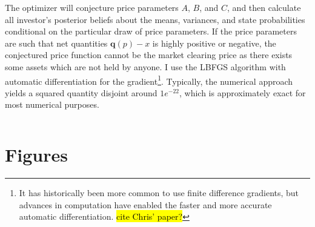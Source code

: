 \documentclass{article}
\begin{document}
The optimizer will conjecture price parameters $A$, $B$, and $C$, and then calculate all investor's posterior beliefs about the means, variances, and state probabilities conditional on the particular draw of price parameters. If the price parameters are such that net quantities $\mathbf{q}(p) - x$ is highly positive or negative, the conjectured price function cannot be the market clearing price as there exists some assets which are not held by anyone. I use the LBFGS algorithm with automatic differentiation for the gradient\footnote{It has historically been more common to use finite difference gradients, but advances in computation have enabled the faster and more accurate automatic differentiation. \hl{cite Chris' paper?}}. Typically, the numerical approach yields a squared quantity disjoint around $1e^{-22}$, which is approximately exact for most numerical purposes.

\begin{table}
    \begin{tabular}{lcccccc}
        
    \end{tabular}
\end{table}

\appendix
\pagebreak

\section{Figures}
\end{document}

